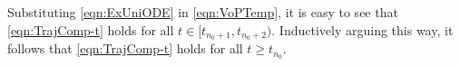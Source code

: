 \documentclass[usenames,dvipsnames,final,12pt]{colt2018} %
\newcommand{\tI}[1]{t_{#1}}
\begin{document}
Substituting \eqref{eqn:ExUniODE} in \eqref{eqn:VoPTemp}, it is easy to see that \eqref{eqn:TrajComp-t} holds for all $t \in [\tI{n_0 + 1}, \tI{n_0 + 2}).$ Inductively arguing this way, it follows that \eqref{eqn:TrajComp-t} holds for all $t \geq \tI{n_0}.$

%
%
%
%
%
%
%
%
%
%
%
%
%
%
%
%
%	
%
%
%
%
%
%
%
%
\end{document}
